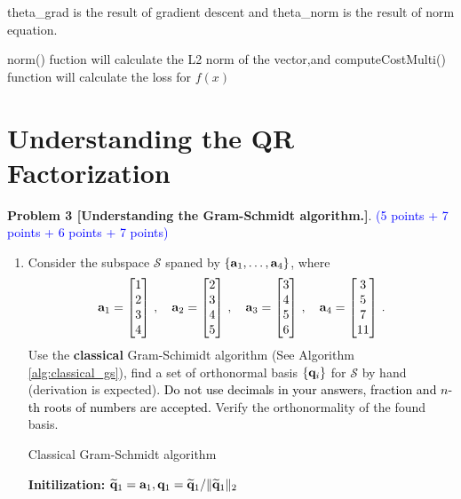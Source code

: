 \documentclass[english,onecolumn]{IEEEtran}
\begin{document}
theta\_grad is the result of gradient descent and theta\_norm is the result of norm equation.

norm() fuction will calculate the L2 norm of the vector,and computeCostMulti() function will calculate the loss for $f(x)$

\newpage
\section{Understanding the QR Factorization}
\noindent\textbf{Problem 3 [Understanding the Gram-Schmidt algorithm.]}. \textcolor{blue}{(5 points + 7 points + 6 points + 7 points)}
\begin{enumerate}
	\item 
	Consider the subspace $\mathcal{S}$ spaned by $\{ {\bf a}_1,\ldots, {\bf a}_4\}$, where
	\[
	{\bf a}_1 = \begin{bmatrix} 1 \\ 2 \\ 3 \\ 4\end{bmatrix}\,,\quad 
	{\bf a}_2 =  \begin{bmatrix}2 \\ 3 \\ 4 \\ 5 \end{bmatrix}\,,\quad 
	{\bf a}_3 =  \begin{bmatrix}3 \\ 4 \\5 \\ 6 \end{bmatrix}\,,\quad
	{\bf a}_4 =  \begin{bmatrix}3 \\ 5 \\7 \\ 11 \end{bmatrix}\,.
	\] 
	Use the \textbf{classical} Gram-Schimidt algorithm (See Algorithm \ref{alg:classical_gs}), find a set of orthonormal basis $\{{\bf q}_i\}$ for $\mathcal{S}$ by hand (derivation is expected). \textcolor{black}{
	Do not use decimals in your answers, fraction and $n$-th roots of numbers are accepted.}
	Verify the orthonormality of the found basis.
	\begin{algorithm}[htbp]
 \label{alg:classical_gs}
\caption{Classical Gram-Schmidt algorithm}
\SetAlgoLined
{}
\textbf{Initilization:} $\widetilde{{\bf q}}_1 = {\bf a}_1, {\bf q}_1 = \widetilde{{\bf q}}_1/\|\widetilde{{\bf q}}_1\|_2$\\

\end{algorithm}
\end{enumerate}
\end{document}
